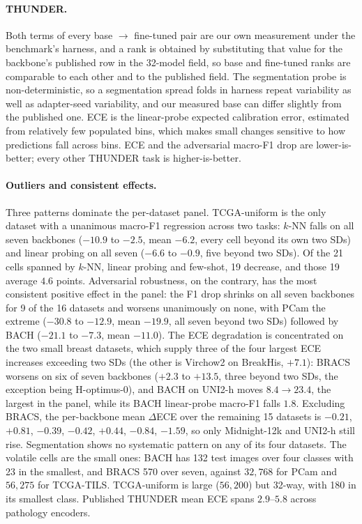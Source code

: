 \paragraph{THUNDER.}
Both terms of every base $\to$ fine-tuned pair are our own measurement under the benchmark's
harness, and a rank is obtained by substituting that value for the backbone's published row in
the 32-model field, so base and fine-tuned ranks are comparable to each other and to the
published field. The segmentation probe is non-deterministic, so a segmentation spread folds in
harness repeat variability as well as adapter-seed variability, and our measured base can differ
slightly from the published one. ECE is the linear-probe expected calibration error, estimated
from relatively few populated bins, which makes small changes sensitive to how predictions fall
across bins. ECE and the adversarial macro-F1 drop are lower-is-better; every other THUNDER task
is higher-is-better.

\paragraph{Outliers and consistent effects.}
Three patterns dominate the per-dataset panel. TCGA-uniform is the only dataset with a
unanimous macro-F1 regression across two tasks: $k$-NN falls on all
seven backbones ($-10.9$ to $-2.5$, mean $-6.2$, every cell beyond its own two SDs) and linear
probing on all seven ($-6.6$ to $-0.9$, five beyond two SDs). Of the 21 cells spanned by $k$-NN,
linear probing and few-shot, 19 decrease, and those 19 average $4.6$ points. Adversarial
robustness, on the contrary, has the most consistent positive effect in the panel: the F1 drop shrinks
on all seven backbones for 9 of the 16 datasets and worsens unanimously on none, with PCam the
extreme ($-30.8$ to $-12.9$, mean $-19.9$, all seven beyond two SDs) followed by BACH ($-21.1$
to $-7.3$, mean $-11.0$). The ECE degradation is concentrated on the two small breast datasets,
which supply three of the four largest ECE increases exceeding two SDs (the other is Virchow2 on BreakHis, $+7.1$): BRACS worsens on six of seven backbones
($+2.3$ to $+13.5$, three beyond two SDs, the exception being H-optimus-0), and BACH on UNI2-h
moves $8.4\to23.4$, the largest in the panel, while its BACH linear-probe macro-F1 falls $1.8$. Excluding
BRACS, the per-backbone mean $\Delta$ECE over the remaining 15 datasets is $-0.21$, $+0.81$,
$-0.39$, $-0.42$, $+0.44$, $-0.84$, $-1.59$, so only Midnight-12k and UNI2-h still rise.
Segmentation shows no systematic pattern on any of its four datasets. The volatile cells are the
small ones: BACH has 132 test images over four classes with 23 in the smallest, and BRACS 570
over seven, against $32{,}768$ for PCam and $56{,}275$ for TCGA-TILS. TCGA-uniform is large
($56{,}200$) but 32-way, with 180 in its smallest class. Published THUNDER mean ECE spans
$2.9$--$5.8$ across pathology encoders.



